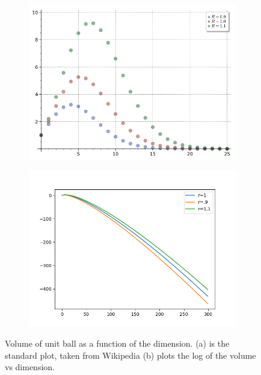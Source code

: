 \documentclass{book}
\begin{document}
\begin{figure}[h]
     \centering
     \begin{subfigure}[b]{0.4\textwidth}
         \centering
         \includegraphics[width=\textwidth]{high_dimensional_space/Volumes_of_unit_balls.png}
         \caption{}
     \end{subfigure}
     \begin{subfigure}[b]{0.4\textwidth}
         \centering
         \includegraphics[width=\textwidth]{high_dimensional_space/Volumes_of_unit_balls_log.png}
         \caption{}
         \label{fig:three sin x}
     \end{subfigure}
        \caption{Volume of unit ball as a function of the dimension. (a) is the standard plot, taken from Wikipedia (b) plots the log of the volume vs dimension.}
        \label{fig:volumes-of-balls}
\end{figure}
\end{document}
